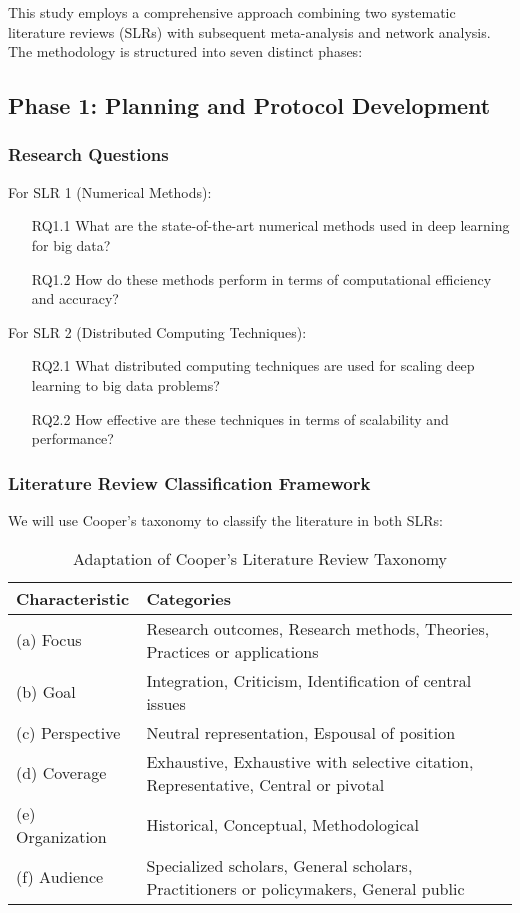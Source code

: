 \documentclass[a4paper,12pt]{article}
\begin{document}
This study employs a comprehensive approach combining two systematic literature reviews (SLRs) with subsequent meta-analysis and network analysis. The methodology is structured into seven distinct phases:

\subsection{Phase 1: Planning and Protocol Development}

\subsubsection{Research Questions}
For SLR 1 (Numerical Methods):
\begin{enumerate}
    \item[RQ1.1] What are the state-of-the-art numerical methods used in deep learning for big data?
    \item[RQ1.2] How do these methods perform in terms of computational efficiency and accuracy?
\end{enumerate}

For SLR 2 (Distributed Computing Techniques):
\begin{enumerate}
    \item[RQ2.1] What distributed computing techniques are used for scaling deep learning to big data problems?
    \item[RQ2.2] How effective are these techniques in terms of scalability and performance?
\end{enumerate}

\subsubsection{Literature Review Classification Framework}
We will use Cooper's taxonomy \citep{cooper1988} to classify the literature in both SLRs:

\begin{table}[h]
\caption{Adaptation of Cooper's Literature Review Taxonomy}
\begin{tabular}{ll}
\hline
Characteristic & Categories \\
\hline
(a) Focus     & Research outcomes, Research methods, Theories, Practices or applications \\
(b) Goal      & Integration, Criticism, Identification of central issues \\
(c) Perspective & Neutral representation, Espousal of position \\
(d) Coverage  & Exhaustive, Exhaustive with selective citation, Representative, Central or pivotal \\
(e) Organization & Historical, Conceptual, Methodological \\
(f) Audience  & Specialized scholars, General scholars, Practitioners or policymakers, General public \\
\hline
\end{tabular}
\end{table}
\end{document}
